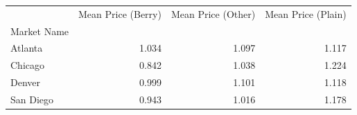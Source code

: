 \begin{tabular}{lrrr}
\toprule
 & Mean Price (Berry) & Mean Price (Other) & Mean Price (Plain) \\
Market Name &  &  &  \\
\midrule
Atlanta & 1.034 & 1.097 & 1.117 \\
Chicago & 0.842 & 1.038 & 1.224 \\
Denver & 0.999 & 1.101 & 1.118 \\
San Diego & 0.943 & 1.016 & 1.178 \\
\bottomrule
\end{tabular}
